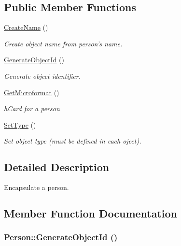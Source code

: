 \subsection*{Public Member Functions}
\begin{CompactItemize}
\item 
\hypertarget{class_person_436b0141f7e12541fe7a1a2b2251d9a5}{
\hyperlink{class_person_436b0141f7e12541fe7a1a2b2251d9a5}{CreateName} ()}
\label{class_person_436b0141f7e12541fe7a1a2b2251d9a5}

\begin{CompactList}\small\item\em Create object name from person's name. \item\end{CompactList}\item 
\hyperlink{class_person_67edc8688a6119602b69f4641d14892b}{GenerateObjectId} ()
\begin{CompactList}\small\item\em Generate object identifier. \item\end{CompactList}\item 
\hyperlink{class_person_706e157885b1f1251a3c9be6992cea66}{GetMicroformat} ()
\begin{CompactList}\small\item\em hCard for a person \item\end{CompactList}\item 
\hypertarget{class_person_805b5db1bfd879b869df7f3427675c05}{
\hyperlink{class_person_805b5db1bfd879b869df7f3427675c05}{SetType} ()}
\label{class_person_805b5db1bfd879b869df7f3427675c05}

\begin{CompactList}\small\item\em Set object type (must be defined in each oject). \item\end{CompactList}\end{CompactItemize}


\subsection{Detailed Description}
Encapsulate a person. 

\subsection{Member Function Documentation}
\hypertarget{class_person_67edc8688a6119602b69f4641d14892b}{
\subsubsection{\setlength{\rightskip}{0pt plus 5cm}Person::GenerateObjectId ()}}
\label{class_person_67edc8688a6119602b69f4641d14892b}


